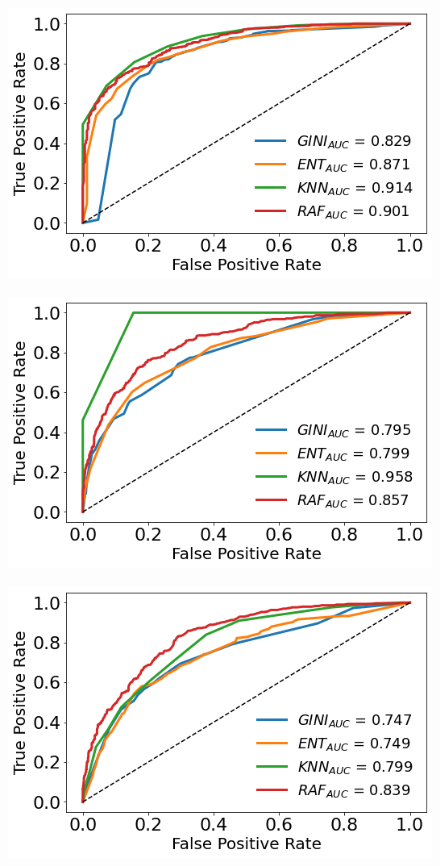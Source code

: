 \documentclass[a4paper,11pt,dvipsnames]{article}
\begin{document}
\begin{figure}[h]
\begin{minipage}[b]{.3\linewidth}
\centering\large \includegraphics[width=0.8\linewidth]{familiarity_ROC_c.png}
\label{fig:famroc}
\end{minipage}%
    \hfil
\begin{minipage}[b]{.3\linewidth}
\centering\includegraphics[width=0.8\linewidth]{semsize_ROC_c.png}\label{fig:semroc}
\end{minipage}    \hfil
\begin{minipage}[b]{.3\linewidth}
\centering\includegraphics[width=0.8\linewidth]{masculinity_ROC_c.png}\label{fig:masroc}
\end{minipage}


\end{figure}
\end{document}
